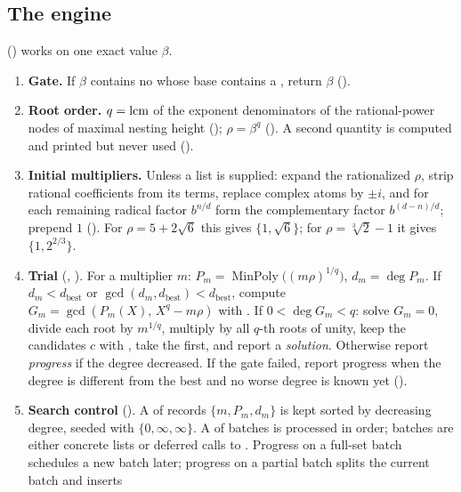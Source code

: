 \subsection{The engine}
\label{sec:engine}
 () works on one exact
value $\beta$.
\begin{enumerate}
\item \textbf{Gate.} If $\beta$ contains no  whose base contains a
      , return $\beta$ ().
\item \textbf{Root order.} $q=\operatorname{lcm}$ of the exponent denominators of the
      rational-power nodes of maximal nesting height ();
      $\rho=\beta^q$ (). A second quantity  is computed
      and printed but never used ().
\item \textbf{Initial multipliers.} Unless a list is supplied: expand the
      rationalized $\rho$, strip rational coefficients from its terms, replace
      complex atoms by $\pm i$, and for each remaining radical factor
      $b^{n/d}$ form the complementary factor $b^{(d-n)/d}$; prepend $1$
      (). For $\rho=5+2\sqrt6$ this gives $\{1,\sqrt6\}$; for
      $\rho=\sqrt[3]2-1$ it gives $\{1,2^{2/3}\}$.
\item \textbf{Trial} (, ). For a multiplier
      $m$: $P_m=\operatorname{MinPoly}\big((m\rho)^{1/q}\big)$, $d_m=\deg P_m$.
      If $d_m<d_{\text{best}}$ or $\gcd(d_m,d_{\text{best}})<d_{\text{best}}$,
      compute $G_m=\gcd(P_m(X),\,X^q-m\rho)$ with .
      If $0<\deg G_m<q$: solve $G_m=0$, divide each root by $m^{1/q}$, multiply by
      all $q$-th roots of unity, keep the candidates $c$ with
      , take the first, and report a
      \emph{solution}. Otherwise report \emph{progress} if the degree decreased.
      If the gate failed, report progress when the degree is different from the
      best and no worse degree is known yet ().
\item \textbf{Search control} (). A  of records
      $\{m,P_m,d_m\}$ is kept sorted by decreasing degree, seeded with
      $\{0,\infty,\infty\}$. A  of batches is processed in
      order; batches are either concrete lists or deferred calls to
      . Progress on a full-set batch schedules a new batch
      later; progress on a partial batch splits the current batch and inserts

\end{enumerate}
